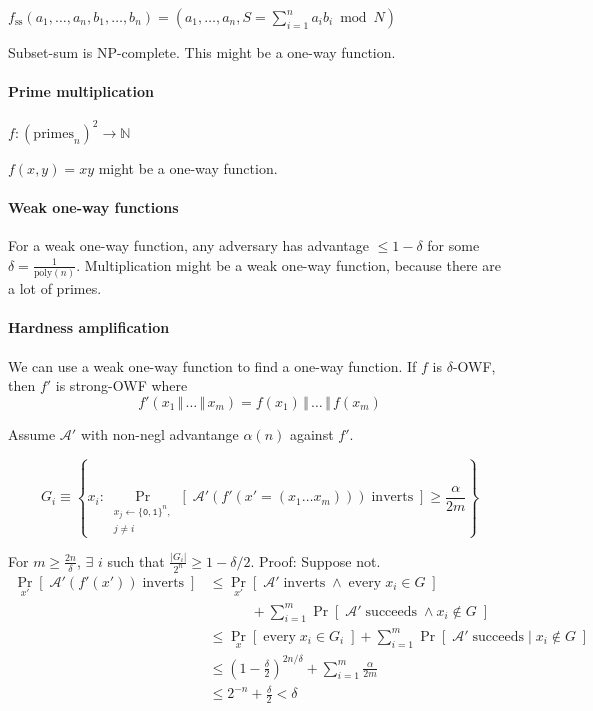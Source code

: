 \documentclass[11pt]{article}
\newcommand{\eqdef}{\ensuremath{\equiv}}
\newcommand{\bit}{\ensuremath{\{\texttt{0},\texttt{1}\}}}
\newcommand{\abs}[1]{{\ensuremath{\left\vert#1\right\vert}}}
\newcommand{\N}{\ensuremath{\mathds{N}}}
\newcommand{\cat}{\ensuremath{\,\Vert\,}}
\newcommand{\AAA}{\ensuremath{\mathcal{A}}}
\theoremstyle{remark}
\begin{document}
$f_{\text{ss}}(a_1, \ldots, a_n, b_1, \ldots, b_n) = (a_1, \ldots, a_n, S = \sum_{i=1}^n a_i b_i \bmod N)$

Subset-sum is NP-complete. This might be a one-way function.

\paragraph{Prime multiplication}
$f : (\text{primes}_n)^2 \rightarrow \N$

$f(x,y) = xy$ might be a one-way function.

\paragraph{Weak one-way functions}

For a weak one-way function, any adversary has advantage $\le 1-\delta$
for some $\delta = \frac{1}{\text{poly}(n)}$.
Multiplication might be a weak one-way function, because there are a lot of primes.

\paragraph{Hardness amplification}

We can use a weak one-way function to find a one-way function.
If $f$ is $\delta$-OWF, then $f'$ is strong-OWF where
\[ f'(x_1 \cat \ldots \cat x_m) = f(x_1) \cat \ldots \cat f(x_m) \]

Assume $\AAA'$ with non-negl advantange $\alpha(n)$ against $f'$.

\[ G_i \eqdef \left\{ x_i : \Pr_{\substack{x_j\gets\bit^n,\\j\neq i}}[\;
  \AAA'(f'(x'=(x_1 \ldots x_m))) \; \text{inverts}
\;] \ge \frac{\alpha}{2m} \right\} \]

For $m \ge \frac{2n}{\delta}$,
$\exists$ $i$ such that $\frac{\abs{G_i}}{2^n} \ge 1-\delta/2$.
Proof: Suppose not.
\begin{align*}
\Pr_{x'}[\;\AAA'(f'(x'))\;\text{inverts}\;]
&\le \Pr_{x'}[\;\AAA'\;\text{inverts}\;\wedge\;\text{every}\;x_i\in G\;] \\
 &\hspace{3em}+ \sum_{i=1}^m \Pr[\;\AAA' \;\text{succeeds}\;\wedge x_i \not\in G\;] \\
&\le \Pr_x[\;\text{every}\;x_i \in G_i\;]
 + \sum_{i=1}^m \Pr[\;\AAA' \;\text{succeeds}\;|\;x_i \not\in G\;] \\
&\le (1-\frac{\delta}{2})^{2n/\delta} + \sum_{i=1}^m \frac{\alpha}{2m} \\
&\le 2^{-n} + \frac{\delta}{2} < \delta
\end{align*}
\end{document}
